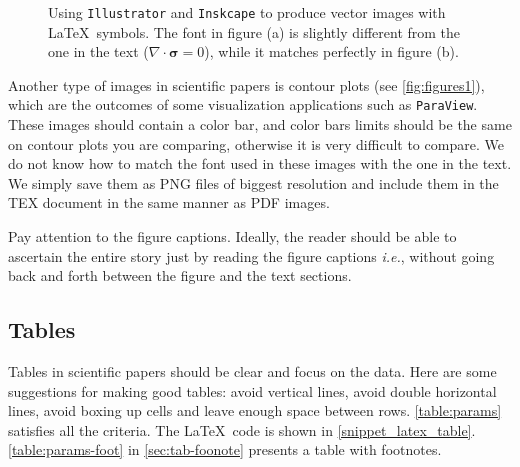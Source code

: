 \documentclass[authoryear,3p,times,preprint,review,fleqn]{elsarticle}
\newcommand{\ie}{\textit{i.e.},\xspace}
\numberwithin{equation}{section}
\theoremstyle{remark}
\begin{document}
\begin{figure}[!h]
  \centering
  \caption{Using \texttt{Illustrator} and \texttt{Inskcape} to produce vector images with \LaTeX\ symbols. The font in figure (a) is slightly different from the one in the text ($\nabla\cdot\boldsymbol{\sigma} = \boldsymbol{\mathit{0}}$), while it matches perfectly in figure (b).}
  \label{fig:figures11}
\end{figure}

Another type of images in scientific papers is contour plots (see \cref{fig:figures1}), which are the outcomes of some visualization applications such as \texttt{ParaView}. These images should contain a color bar, and color bars limits should be the same on contour plots you are comparing, otherwise it is very difficult to compare. We do not know how to match the font used in these images with the one in the text. We simply save them as PNG files of biggest resolution and include them in the TEX document in the same manner as PDF images.

 Pay attention to the figure captions. Ideally, the reader should be able to ascertain the entire story just by reading the figure captions \ie without going back and forth between the figure and the text sections.

\subsection{Tables}\label{sec:tabs}

Tables in scientific papers should be clear and focus on the data. Here are some suggestions for making good tables: avoid vertical lines, avoid double horizontal lines, avoid boxing up cells and leave enough space between rows. 
\cref{table:params} satisfies all the criteria. The \LaTeX\ code is shown in \cref{snippet_latex_table}.
\cref{table:params-foot} in \cref{sec:tab-foonote} presents a table with footnotes.
\end{document}
